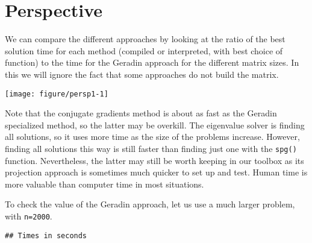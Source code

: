 \documentclass[10pt]{article}\usepackage[]{graphicx}\usepackage[]{color}
\makeatletter
\def\maxwidth{ %
  \ifdim\Gin@nat@width>\linewidth
    \linewidth
  \else
    \Gin@nat@width
  \fi
}
\newenvironment{kframe}{%
 \def\at@end@of@kframe{}%
 \ifinner\ifhmode%
  \def\at@end@of@kframe{\end{minipage}}%
  \begin{minipage}{\columnwidth}%
 \fi\fi%
 \def\FrameCommand##1{\hskip\@totalleftmargin \hskip-\fboxsep
 \colorbox{shadecolor}{##1}\hskip-\fboxsep
     \hskip-\linewidth \hskip-\@totalleftmargin \hskip\columnwidth}%
 \MakeFramed {\advance\hsize-\width
   \@totalleftmargin\z@ \linewidth\hsize
   \@setminipage}}%
 {\par\unskip\endMakeFramed%
 \at@end@of@kframe}
\newenvironment{knitrout}{}{} %
\newcommand{\code}[1]{{\tt #1}}
\makeatother
\begin{document}
\section{Perspective}

We can compare the different approaches by looking at the ratio of the best
solution time for each method (compiled or interpreted, with best choice of
function) to the time for the Geradin approach for the different matrix sizes. 
In this we will ignore the fact that some approaches do not build the matrix.

\begin{knitrout}\scriptsize
{}\color{fgcolor}\begin{kframe}


{\ttfamily\noindent\bfseries\color{errorcolor}{\#\# Error in plot.window(...): need finite 'ylim' values}}\end{kframe}
\texttt{[image: figure/persp1-1]} 

\end{knitrout}


Note that the conjugate gradients method is about as fast as the Geradin specialized 
method, so the latter may be overkill. The eigenvalue solver is finding all solutions, 
so it uses more time as the size of the problems increase. However, finding all solutions
this way is still faster than finding just one with the \code{spg()} function. Nevertheless,
the latter may still be worth keeping in our toolbox as its projection approach is 
sometimes much quicker to set up and test. Human time is more valuable than computer
time in most situations.


To check the value of the Geradin approach, let us use a much larger problem,
with \code{n=2000}. 

\begin{knitrout}\scriptsize
{}\color{fgcolor}\begin{kframe}


{\ttfamily\noindent\bfseries{}}

{\ttfamily\noindent\itshape\color{messagecolor}{\#\# Timing stopped at: 0 0 0}}\begin{verbatim}
## Times in seconds
\end{verbatim}


{\ttfamily\noindent\bfseries{}}

{\ttfamily\noindent\bfseries{}}\end{kframe}
\end{knitrout}
\end{document}
